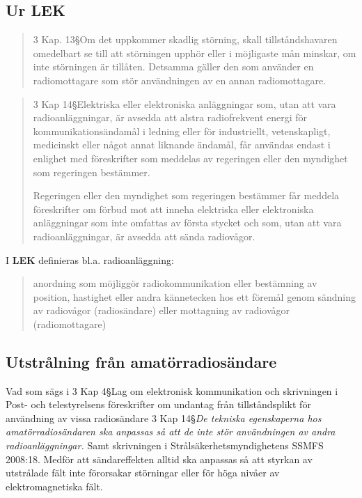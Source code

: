 \subsection{Ur LEK}

\begin{quote}
3 Kap. 13\S Om det uppkommer skadlig störning, skall tillståndshavaren
omedelbart se till att störningen upphör eller i möjligaste mån minskar, om
inte störningen är tillåten.
Detsamma gäller den som använder en radiomottagare som stör användningen av en
annan radiomottagare.
\end{quote}

\begin{quote}
3 Kap 14\S Elektriska eller elektroniska anläggningar som, utan att vara
radioanläggningar, är avsedda att alstra radiofrekvent energi för
kommunikationsändamål i ledning eller för industriellt, vetenskapligt,
medicinskt eller något annat liknande ändamål, får användas endast i enlighet
med föreskrifter som meddelas av regeringen eller den myndighet som regeringen
bestämmer.

Regeringen eller den myndighet som regeringen bestämmer får meddela
föreskrifter om förbud mot att inneha elektriska eller elektroniska
anläggningar som inte omfattas av första stycket och som, utan att vara
radioanläggningar, är avsedda att sända radiovågor.
\end{quote}

I \textbf{LEK} definieras bl.a. radioanläggning:
\begin{quote}
anordning som möjliggör radiokommunikation eller bestämning av position,
hastighet eller andra kännetecken hos ett föremål genom sändning av radiovågor
(radiosändare) eller mottagning av radiovågor (radiomottagare)
\end{quote}

\subsection{Utstrålning från amatörradiosändare}

Vad som sägs i 3 Kap 4\S Lag om elektronisk kommunikation och skrivningen i
Post- och telestyrelsens föreskrifter om undantag från tillståndsplikt för
användning av vissa radiosändare 3 Kap 14\S \emph{De tekniska egenskaperna hos
amatörradiosändaren ska anpassas så att de inte stör användningen av andra
radioanläggningar.}
Samt skrivningen i Strålsäkerhetsmyndighetens SSMFS 2008:18.
Medför att sändareffekten alltid ska anpassas så att styrkan av utstrålade
fält inte förorsakar störningar eller för höga nivåer av elektromagnetiska fält.

